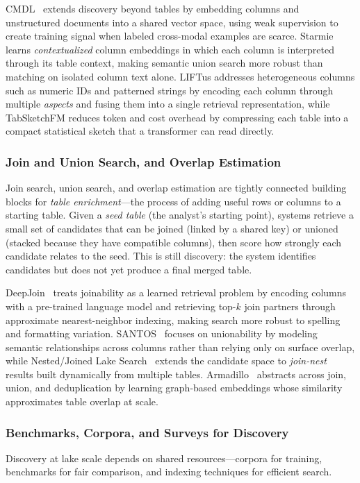 \documentclass[sigconf]{acmart}
\begin{document}
CMDL~\cite{10.14778/3611479.3611533} extends discovery beyond tables by embedding columns and unstructured documents into a shared vector space, using weak supervision to create training signal when labeled cross-modal examples are scarce. Starmie learns \emph{contextualized} column embeddings in which each column is interpreted through its table context, making semantic union search more robust than matching on isolated column text alone. LIFTus addresses heterogeneous columns such as numeric IDs and patterned strings by encoding each column through multiple \emph{aspects} and fusing them into a single retrieval representation, while TabSketchFM reduces token and cost overhead by compressing each table into a compact statistical sketch that a transformer can read directly.

\subsubsection{Join and Union Search, and Overlap Estimation}
Join search, union search, and overlap estimation are tightly connected building blocks for \emph{table enrichment}---the process of adding useful rows or columns to a starting table. Given a \emph{seed table} (the analyst's starting point), systems retrieve a small set of candidates that can be joined (linked by a shared key) or unioned (stacked because they have compatible columns), then score how strongly each candidate relates to the seed. This is still discovery: the system identifies candidates but does not yet produce a final merged table.

DeepJoin~\cite{10.14778/3603581.3603587} treats joinability as a learned retrieval problem by encoding columns with a pre-trained language model and retrieving top-$k$ join partners through approximate nearest-neighbor indexing, making search more robust to spelling and formatting variation. SANTOS~\cite{10.1145/3588689} focuses on unionability by modeling semantic relationships across columns rather than relying only on surface overlap, while Nested/Joined Lake Search~\cite{10.14778/3681954.3682005} extends the candidate space to \emph{join-nest} results built dynamically from multiple tables. Armadillo~\cite{10.1145/3725365} abstracts across join, union, and deduplication by learning graph-based embeddings whose similarity approximates table overlap at scale.

\subsubsection{Benchmarks, Corpora, and Surveys for Discovery}
Discovery at lake scale depends on shared resources---corpora for training, benchmarks for fair comparison, and indexing techniques for efficient search.
\end{document}
